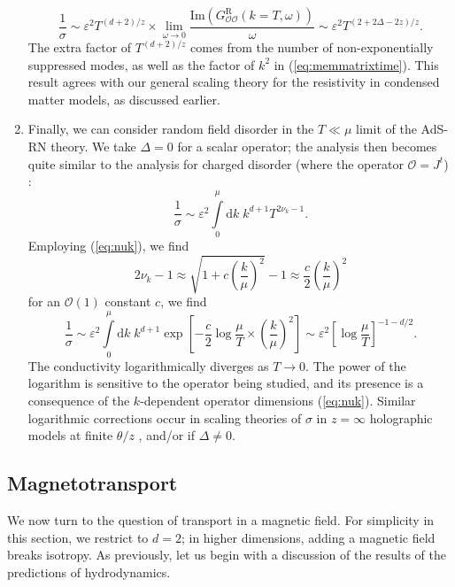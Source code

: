 \documentclass[10pt, oneside]{book}
\begin{document}
\begin{doublespace}
\begin{enumerate}
\begin{equation}
\frac{1}{\sigma} \sim \varepsilon^2 T^{(d+2)/z} \times \lim_{\omega\rightarrow 0} \frac{\mathrm{Im}\left(G^{\mathrm{R}}_{\mathcal{OO}}(k=T,\omega)\right)}{\omega} \sim \varepsilon^2 T^{(2+2\Delta-2z)/z}.
\end{equation}
The extra factor of $T^{(d+2)/z}$ comes from the number of non-exponentially suppressed modes, as well as the factor of $k^2$ in (\ref{eq:memmatrixtime}).   This result agrees with our general scaling theory for the resistivity in condensed matter models, as discussed earlier.
\item Finally, we can consider random field disorder in the $T\ll \mu$ limit of the AdS-RN theory.   We take $\Delta=0$ for a scalar operator;  the analysis then becomes quite similar to the analysis for charged disorder (where the operator $\mathcal{O} = J^t$) \cite{Hartnoll:2012rj}:
\begin{equation}
\frac{1}{\sigma} \sim \varepsilon^2 \int\limits_0^\mu \mathrm{d}k \; k^{d+1} T^{2\nu_k -1}.
\end{equation}
Employing (\ref{eq:nuk}), we find \begin{equation}
2\nu_k - 1 \approx \sqrt{1+ c\left(\frac{k}{\mu}\right)^2} - 1 \approx \frac{c}{2} \left(\frac{k}{\mu}\right)^2
\end{equation}
for an $\mathcal{O}(1)$ constant $c$, we find \begin{equation}
\frac{1}{\sigma} \sim \varepsilon^2 \int\limits_0^\mu \mathrm{d}k \; k^{d+1} \exp\left[-\frac{c}{2} \log \frac{\mu}{T} \times \left(\frac{k}{\mu}\right)^2\right] \sim \varepsilon^2 \left[\log \frac{\mu}{T}\right]^{-1-d/2}.
\end{equation}
The conductivity logarithmically diverges as $T\rightarrow 0$.  The power of the logarithm is sensitive to the operator being studied, and its presence is a consequence of the $k$-dependent operator dimensions (\ref{eq:nuk}).  Similar logarithmic corrections occur in scaling theories of $\sigma$ in $z=\infty$ holographic models at finite $\theta/z$ \cite{Lucas:2014sba}, and/or if $\Delta \ne 0$.
\end{enumerate}

\subsection{Magnetotransport}
\label{sec:magtrans}
   
We now turn to the question of transport in a magnetic field.  For simplicity in this section, we restrict to $d=2$;  in higher dimensions, adding a magnetic field breaks isotropy.   As previously, let us begin with a discussion of the results of the predictions of hydrodynamics.   


\end{doublespace}
\end{document}
